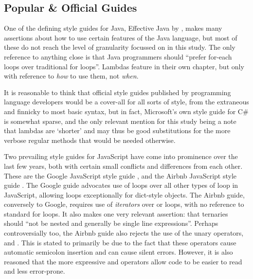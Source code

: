 \documentclass{article}
\begin{document}
    \subsection{Popular \& Official Guides}
        One of the defining style guides for Java, Effective Java by \cite{effectiveJava}, makes many assertions about how to use certain features of the Java language, but most of these do not reach the level of granularity focussed on in this study. The only reference to anything close is that Java programmers should ``prefer for-each loops over traditional for loops''. Lambdas feature in their own chapter, but only with reference to \emph{how} to use them, not \emph{when}.

        It is reasonable to think that official style guides published by programming language developers would be a cover-all for all sorts of style, from the extraneous and finnicky to most basic syntax, but in fact, Microsoft's own style guide for C\# is somewhat sparse, and the only relevant mention for this study being a note that lambdas are `shorter' and may thus be good substitutions for the more verbose regular methods that would be needed otherwise.

        Two prevailing style guides for JavaScript have come into prominence over the last few years, both with certain small conflicts and differences from each other. These are the Google JavaScript style guide \citep{googleJSStyle}, and the Airbnb JavaScript style guide \citep{airbnbJSStyle}. The Google guide advocates use of  loops over all other types of  loop in JavaScript, allowing  loops exceptionally for dict-style objects. The Airbnb guide, conversely to Google, requires use of \emph{iterators} over  or  loops, with no reference to standard for loops. It also makes one very relevant assertion: that ternaries should ``not be nested and generally be single line expressions''. Perhaps controversially too, the Airbnb guide also rejects the use of the unary operators, \codeword{++} and \codeword{--}. This is stated to primarily be due to the fact that these operators cause automatic semicolon insertion and can cause silent errors. However, it is also reasoned that the more expressive \codeword{+=} and \codeword{-=} operators allow code to be easier to read and less error-prone.
\end{document}
